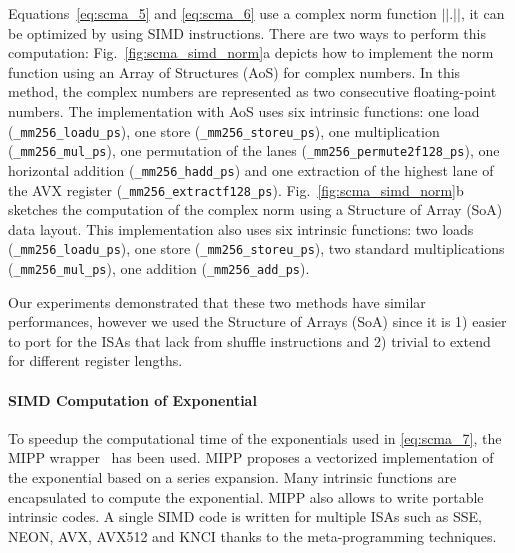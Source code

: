 Equations~\eqref{eq:scma_5} and \eqref{eq:scma_6} use a complex norm function
$||.||$, it can be optimized by using SIMD instructions. There are two ways to
perform this computation: Fig.~\ref{fig:scma_simd_norm}a depicts how to
implement the norm function using an Array of Structures (AoS) for complex
numbers. In this method, the complex numbers are represented as two consecutive
floating-point numbers. The implementation with AoS uses six intrinsic
functions: one load (\verb|_mm256_loadu_ps|), one store
(\verb|_mm256_storeu_ps|), one multiplication (\verb|_mm256_mul_ps|), one
permutation of the lanes (\verb|_mm256_permute2f128_ps|), one horizontal
addition (\verb|_mm256_hadd_ps|) and one extraction of the highest lane of the
AVX register (\verb|_mm256_extractf128_ps|). Fig.~\ref{fig:scma_simd_norm}b
sketches the computation of the complex norm using a Structure of Array (SoA)
data layout. This implementation also uses six intrinsic functions: two loads
(\verb|_mm256_loadu_ps|), one store (\verb|_mm256_storeu_ps|), two standard
multiplications (\verb|_mm256_mul_ps|), one addition (\verb|_mm256_add_ps|).

Our experiments demonstrated that these two methods have similar performances,
however we used the Structure of Arrays (SoA) since it is 1) easier to port for
the ISAs that lack from shuffle instructions and 2) trivial to extend for
different register lengths.

\paragraph{SIMD Computation of Exponential}

To speedup the computational time of the exponentials used in \eqref{eq:scma_7},
the MIPP wrapper~\cite{Cassagne2018} has been used. MIPP proposes a vectorized
implementation of the exponential based on a series expansion. Many intrinsic
functions are encapsulated to compute the exponential. MIPP also allows to write
portable intrinsic codes. A single SIMD code is written for multiple ISAs such
as SSE, NEON, AVX, AVX512 and KNCI thanks to the meta-programming techniques.

